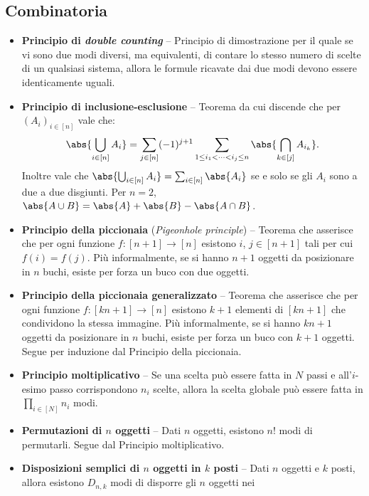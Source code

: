\begin{multicols*}{2}
\section*{Combinatoria}

\begin{itemize}
    \item \textbf{Principio di \textit{double counting}} -- Principio di dimostrazione per il quale
    se vi sono due modi diversi, ma equivalenti, di contare lo stesso numero di scelte
    di un qualsiasi sistema, allora le formule ricavate dai due modi devono
    essere identicamente uguali.
    \item \textbf{Principio di inclusione-esclusione} -- Teorema da cui discende che per $(A_i)_{i \in [n]}$ vale che: \[\abs{\bigcup_{i \in [n]} A_i} = \sum_{j \in [n]} (-1)^{j+1} \sum_{1 \leq i_1 < \cdots < i_j \leq n} \abs{\bigcap_{k \in [j]} A_{i_k}}.\]
    Inoltre vale che $\abs{\bigcup_{i \in [n]} A_i} = \sum_{i \in [n]} \abs{A_i}$ se e solo se gli $A_i$ sono a due a due disgiunti. Per $n = 2$,
    $\abs{A \cup B} = \abs{A} + \abs{B} - \abs{A \cap B}$.
    \item \textbf{Principio della piccionaia} (\textit{Pigeonhole principle}) -- Teorema che
    asserisce che per ogni funzione $f : [n+1] \to [n]$ esistono $i$, $j \in [n+1]$
    tali per cui $f(i) = f(j)$. Più informalmente, se si hanno $n+1$ oggetti da
    posizionare in $n$ buchi, esiste per forza un buco con due oggetti.
    \item \textbf{Principio della piccionaia generalizzato} -- Teorema che asserisce che
    per ogni funzione $f : [kn+1] \to [n]$ esistono $k+1$ elementi di $[kn+1]$ che
    condividono la stessa immagine. Più informalmente, se si hanno $kn+1$ oggetti
    da posizionare in $n$ buchi, esiste per forza un buco con $k+1$ oggetti. Segue per
    induzione dal Principio della piccionaia.
    \item \textbf{Principio moltiplicativo} -- Se una scelta può essere fatta in $N$
    passi e all'$i$-esimo passo corrispondono $n_i$ scelte, allora la scelta globale
    può essere fatta in $\prod_{i \in [N]} n_i$ modi.
    \item \textbf{Permutazioni di $n$ oggetti} -- Dati $n$ oggetti, esistono
    $n!$ modi di permutarli. Segue dal Principio moltiplicativo.
    \item \textbf{Disposizioni semplici di $n$ oggetti in $k$ posti} -- Dati $n$ oggetti
    e $k$ posti, allora esistono $D_{n,k}$ modi di disporre gli $n$ oggetti nei

\end{itemize}
\end{multicols*}

